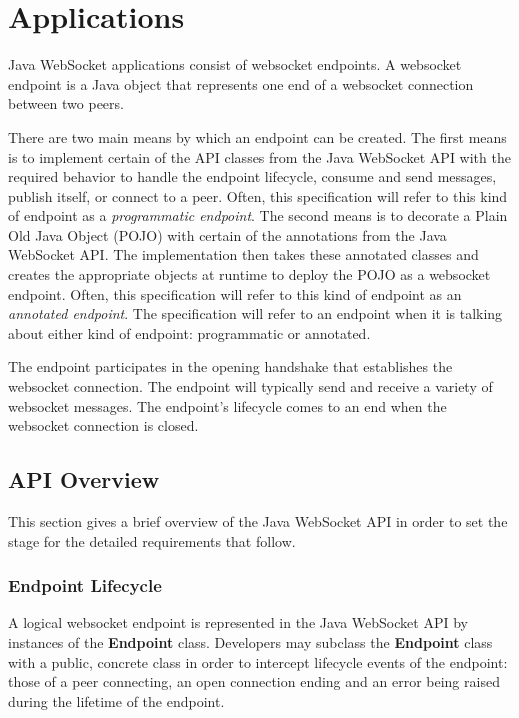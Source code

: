 \chapter{Applications}
\label{applications}

Java WebSocket applications consist of websocket endpoints. A websocket endpoint is a Java object that represents one end of a websocket connection between two peers.

There are two main means by which an endpoint can be created. The first means is to implement certain of the API classes from the Java WebSocket API with the required behavior to handle the endpoint lifecycle, consume and send messages, publish itself, or connect to a peer. Often, this specification will refer to this kind of endpoint as a \emph{programmatic endpoint}. The second means is to decorate a Plain Old Java Object (POJO) with certain of the annotations from the Java WebSocket API. The implementation then takes these annotated classes and creates the appropriate objects at runtime to deploy the POJO as a websocket endpoint. Often, this specification will refer to this kind of endpoint as an \emph{annotated endpoint}. The specification will refer to an endpoint when it is talking about either kind of endpoint: programmatic or annotated.

The endpoint participates in the opening handshake that establishes the websocket connection. The endpoint will typically send and receive a variety of websocket messages. The endpoint’s lifecycle comes to an end when the websocket connection is closed.

\section{API Overview}
\label{api}

This section gives a brief overview of the Java WebSocket API in order to set the stage for the detailed requirements that follow.

\subsection{Endpoint Lifecycle}

A logical websocket endpoint is represented in the Java WebSocket API by instances of the \textbf{Endpoint} class. Developers may subclass the \textbf{Endpoint} class with a public, concrete class in order to intercept lifecycle events of the endpoint: those of a peer connecting, an open connection ending and an error being raised during the lifetime of the endpoint.

